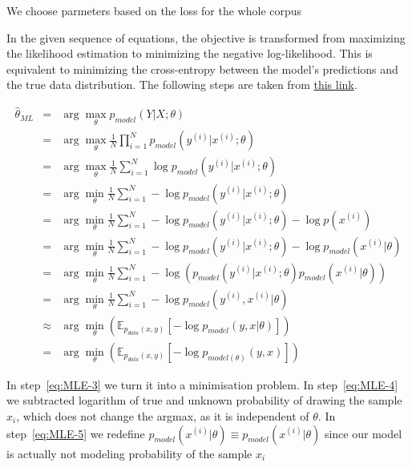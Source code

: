 \documentclass[11pt]{article}
\begin{document}
We choose parmeters based on the loss for the whole corpus

In the given sequence of equations, the objective is transformed from maximizing the likelihood estimation to minimizing the negative log-likelihood. This is equivalent to minimizing the cross-entropy between the model's predictions and the true data distribution. The following steps are taken from \href{https://stats.stackexchange.com/questions/428937/mle-and-cross-entropy-for-conditional-probabilities/477867#477867}{this link}.

\begin{eqnarray} 
    \hat{\theta}_{ML} &=& \arg\max_{\theta} p_{model}(Y|X;\theta) \label{eq:MLE-0} \\
    &=& \arg\max_{\theta} \frac{1}{N} \prod_{i=1}^{N} p_{model}(y^{(i)}|x^{(i)};\theta) \label{eq:MLE-1} \\
    &=& \arg\max_{\theta} \frac{1}{N} \sum_{i=1}^{N} \log p_{model}(y^{(i)}|x^{(i)};\theta) \label{eq:MLE-1} \\
    &=& \arg\min_{\theta} \frac{1}{N} \sum_{i=1}^{N} - \log p_{model}(y^{(i)}|x^{(i)};\theta)  \label{eq:MLE-2} \\
    &=& \arg\min_{\theta} \frac{1}{N} \sum_{i=1}^{N} - \log p_{model}(y^{(i)}|x^{(i)};\theta) - \log p(x^{(i)}) \label{eq:MLE-3} \\
    &=& \arg\min_{\theta} \frac{1}{N} \sum_{i=1}^{N} - \log p_{model}(y^{(i)}|x^{(i)};\theta) - \log p_{model}(x^{(i)}|\theta) \label{eq:MLE-4} \\
    &=& \arg\min_{\theta} \frac{1}{N} \sum_{i=1}^{N} - \log \left( p_{model}(y^{(i)}|x^{(i)};\theta)p_{model}(x^{(i)}|\theta) \right) \label{eq:MLE-5} \\
    &=& \arg\min_{\theta} \frac{1}{N} \sum_{i=1}^{N} - \log  p_{model}(y^{(i)}, x^{(i)}|\theta) \label{eq:MLE-6} \\
    &\approx& \arg\min_{\theta} \left(\mathbb{E}_{p_{data}(x,y)}\left[ -\log p_{model}(y,x|\theta) \right] \right) \label{eq:MLE-7} \\
    &=& \arg\min_{\theta} \left(\mathbb{E}_{p_{data}(x,y)}\left[ -\log p_{model(\theta)}(y,x) \right] \right) \label{eq:MLE-8} 
\end{eqnarray}

In step~\ref{eq:MLE-3} we turn it into a minimisation problem. In step~\ref{eq:MLE-4} we subtracted logarithm of true and unknown probability of drawing the sample $x_i$, which does not change the argmax, as it is independent of $\theta$. In step~\ref{eq:MLE-5} we redefine $p_{model}(x^{(i)}|\theta) \equiv p_{model}(x^{(i)}|\theta)$ since our model is actually not modeling probability of the sample $x_i$
\end{document}
